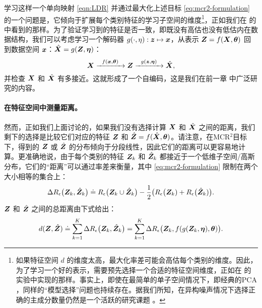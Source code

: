 \documentclass[../../book-main.tex]{subfiles}
\begin{document}
{学习这样一个单向映射 \eqref{eqn:LDR} 并通过最大化上述目标 \eqref{eq:mcr2-formulation} 的一个问题是，它倾向于扩展每个类别特征的学习子空间的维度\footnote{如果特征空间 $d$ 的维度太高，最大化率差可能会高估每个类别的维度。因此，为了学习一个好的表示，需要预先选择一个合适的特征空间维度，正如在 \cite{yu2020learning} 的实验中实现的那样。事实上，即使在最简单的单子空间情况下，即经典的PCA \cite{Jolliffe1986}，同样的“模型选择”问题也持续存在。据我们所知，在异构噪声情况下选择正确的主成分数量仍然是一个活跃的研究课题 \cite{hong2020selecting}。}，正如我们在  的  中看到的那样。为了验证学习到的特征是否一致，即既没有高估也没有低估内在数据结构，我们可以考虑学习一个解码器 $g(\cdot,\eta): \bm{z} \mapsto  \bm{x}$，从表示 $\bm{Z} = f(\bm{X},\bm\theta)$ 回到数据空间 $\bm{x}$：$\hat {\bm{X}} = g(\bm{Z}, \bm\eta)$：
\begin{equation}
    \bm{X} \xrightarrow{\hspace{2mm} f(\bm{x}, \bm\theta)\hspace{2mm}} \bm{Z} \xrightarrow{\hspace{2mm} g(\bm{z}, \bm \eta) \hspace{2mm}} \hat {\bm{X}}, 
    \label{eqn:autoencoding-ch6}
\end{equation}
并检查 $\bm{X}$ 和 $\hat {\bm{X}}$ 有多接近。这就形成了一个自编码，这是我们在前一章  中广泛研究的内容。

\paragraph{在特征空间中测量距离。}
然而，正如我们上面讨论的，如果我们没有选择计算 $\bm{X}$ 和 $\hat {\bm{X}}$ 之间的距离，我们剩下的选择是比较它们对应的特征 $\bm{Z}$ 和 $\hat {\bm{Z}} = f(\hat {\bm{X}}, \bm \theta)$。请注意，在MCR$^2$目标下，得到的 $\bm{Z}$ 或 $\hat {\bm{Z}}$ 的分布倾向于分段线性，因此它们的距离可以更容易地计算。更准确地说，由于每个类别的特征 $\bm{Z}_k$ 和 $\hat{\bm{Z}}_k$ 都接近于一个低维子空间/高斯分布，它们的“距离”可以通过率差来衡量，{其中 \eqref{eq:mcr2-formulation} 限制在两个大小相等的集合上}：
\begin{equation}
\Delta R_\epsilon\big(\bm{Z}_k, \hat{\bm{Z}}_k\big) \doteq R_\epsilon\big(\bm{Z}_k \cup \hat{\bm{Z}}_k\big) - \frac{1}{2} \big( R_\epsilon\big(\bm{Z}_k) + R_\epsilon\big(\hat {\bm{Z}}_k)\big).
\end{equation}
$\bm{Z}$ 和 $\hat {\bm{Z}}$ 之间的总距离由下式给出：
\begin{equation}
d(\bm{Z}, \hat {\bm{Z}}) \doteq   \sum_{k=1}^K \Delta R_\epsilon\big(\bm{Z}_k, \hat{\bm{Z}}_k\big) =  \sum_{k=1}^K \Delta R_\epsilon\big(\bm{Z}_k, f(g(\bm{Z}_k, \bm\eta),\bm \theta)\big).
\label{eqn:Z-distance}
\end{equation}


}
\end{document}

